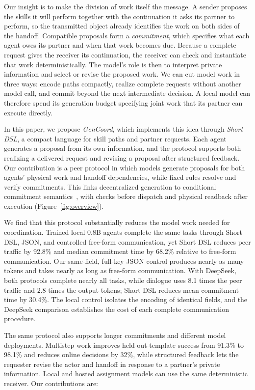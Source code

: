 \documentclass[sigconf,nonacm,balance=false]{aamas}
\begin{document}
Our insight is to make the division of work itself the message. A sender proposes the skills it will perform together with the continuation it asks its partner to perform, so the transmitted object already identifies the work on both sides of the handoff. Compatible proposals form a \emph{commitment}, which specifies what each agent owes its partner and when that work becomes due. Because a complete request gives the receiver its continuation, the receiver can check and instantiate that work deterministically. The model's role is then to interpret private information and select or revise the proposed work. We can cut model work in three ways: encode paths compactly, realize complete requests without another model call, and commit beyond the next intermediate decision. A local model can therefore spend its generation budget specifying joint work that its partner can execute directly.

In this paper, we propose \emph{GenCoord}, which implements this idea through \emph{Short DSL}, a compact language for skill paths and partner requests. Each agent generates a proposal from its own information, and the protocol supports both realizing a delivered request and revising a proposal after structured feedback. Our contribution is a peer protocol in which models generate proposals for both agents' physical work and handoff dependencies, while fixed rules resolve and verify commitments. This links decentralized generation to conditional commitment semantics~\cite{singh1998acl,singh2008commitments,chopra2025azorus}, with checks before dispatch and physical readback after execution (Figure~\ref{fig:overview}).

We find that this protocol substantially reduces the model work needed for coordination. Trained local 0.8B agents complete the same tasks through Short DSL, JSON, and controlled free-form communication, yet Short DSL reduces peer traffic by 92.8\% and median commitment time by 68.2\% relative to free-form communication. Our same-field, full-key JSON control produces nearly as many tokens and takes nearly as long as free-form communication. With DeepSeek, both protocols complete nearly all tasks, while dialogue uses 8.1 times the peer traffic and 2.8 times the output tokens; Short DSL reduces mean commitment time by 30.4\%. The local control isolates the encoding of identical fields, and the DeepSeek comparison establishes the cost of each complete communication procedure.

The same protocol also supports longer commitments and different model deployments. Multistep work improves held-out-template success from 91.3\% to 98.1\% and reduces online decisions by 32\%, while structured feedback lets the requester revise the actor and handoff in response to a partner's private information. Local and hosted assignment models can use the same deterministic receiver. Our contributions are:
\end{document}
